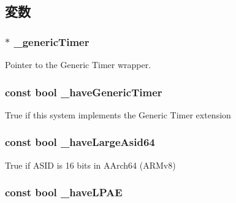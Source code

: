 \subsection{変数}
\hypertarget{classArmSystem_a5402fcff3a17875626c3a32694fa7303}{
\subsubsection[{\_\-genericTimer}]{$\ast$ {\bf \_\-genericTimer}}}
\label{classArmSystem_a5402fcff3a17875626c3a32694fa7303}
Pointer to the Generic Timer wrapper. \hypertarget{classArmSystem_aca3aa280f7b7c05a9b554608cfaf4418}{
\subsubsection[{\_\-haveGenericTimer}]{\setlength{\rightskip}{0pt plus 5cm}const bool {\bf \_\-haveGenericTimer}}}
\label{classArmSystem_aca3aa280f7b7c05a9b554608cfaf4418}
True if this system implements the Generic Timer extension \hypertarget{classArmSystem_aa8ec26eb0cbc124e0b9f5338b476ebfa}{
\subsubsection[{\_\-haveLargeAsid64}]{\setlength{\rightskip}{0pt plus 5cm}const bool {\bf \_\-haveLargeAsid64}}}
\label{classArmSystem_aa8ec26eb0cbc124e0b9f5338b476ebfa}
True if ASID is 16 bits in AArch64 (ARMv8) \hypertarget{classArmSystem_a1215984ae18da163f0042f3e1fc64403}{
\subsubsection[{\_\-haveLPAE}]{\setlength{\rightskip}{0pt plus 5cm}const bool {\bf \_\-haveLPAE}}}
